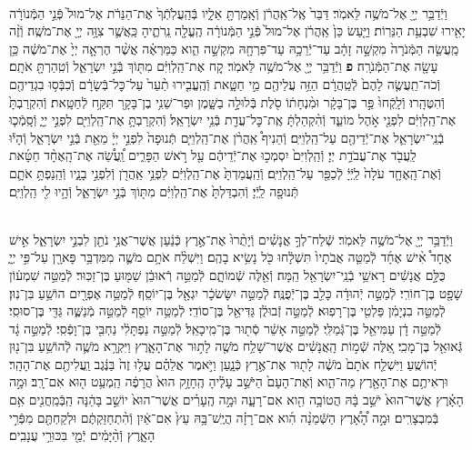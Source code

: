 \documentclass[twoside, openany, parskip=half, 11pt]{book}
\begin{document}
\begin{footnotesize}
\begin{multicols}{2}
\\
וַיְֿדַבֵּ֥ר יְיָ֖ אֶל־מֹשֶׁ֥ה לֵּאמֹֽר׃ דַּבֵּר֙ אֶֽל־אַֽהֲרֹ֔ן וְֿאָֽמַרְתָּ֖ אֵלָ֑יו בְּֿהַֽעֲלֹֽתְֿךָ֙ אֶת־הַנֵּרֹ֔ת אֶל־מוּל֙ פְּֿנֵ֣י הַמְּֿנוֹרָ֔ה יָאִ֖ירוּ שִׁבְעַ֥ת הַנֵּרֽוֹת׃ וַיַּ֤עַשׂ כֵּן֙ אַֽהֲרֹ֔ן אֶל־מוּל֙ פְּֿנֵ֣י הַמְּֿנוֹרָ֔ה הֶֽעֱלָ֖ה נֵֽרֹתֶ֑יהָ כַּֽאֲשֶׁ֛ר צִוָּ֥ה יְיָ֖ אֶת־מֹשֶֽׁה׃ וְֿזֶ֨ה מַֽעֲשֵׂ֤ה הַמְּֿנֹרָה֙ מִקְשָׁ֣ה זָהָ֔ב עַד־יְֿרֵכָ֥הּ עַד־פִּרְחָ֖הּ מִקְשָׁ֣ה הִ֑וא כַּמַּרְאֶ֗ה אֲשֶׁ֨ר הֶרְאָ֤ה יְיָ֙ אֶת־מֹשֶׁ֔ה כֵּ֥ן עָשָׂ֖ה אֶת־הַמְּֿנֹרָֽה׃ \textbf{פ}
וַיְֿדַבֵּ֥ר יְיָ֖ אֶל־מֹשֶׁ֥ה לֵּאמֹֽר׃ קַ֚ח אֶת־הַֽלְוִיִּ֔ם מִתּ֖וֹךְ בְּֿנֵ֣י יִשְׂרָאֵ֑ל וְֿטִֽהַרְתָּ֖ אֹתָֽם׃ וְֿכֹה־תַֽעֲשֶׂ֤ה לָהֶם֙ לְֿטַֽהֲרָ֔ם הַזֵּ֥ה עֲלֵיהֶ֖ם מֵ֣י חַטָּ֑את וְֿהֶֽעֱבִ֤ירוּ תַ֨עַר֙ עַל־כׇּל־בְּֿשָׂרָ֔ם וְֿכִבְּֿס֥וּ בִגְדֵיהֶ֖ם וְֿהִטֶּהָֽרוּ׃ וְֿלָֽקְֿחוּ֙ פַּ֣ר בֶּן־בָּקָ֔ר וּמִ֨נְחָת֔וֹ סֹ֖לֶת בְּֿלוּלָ֣ה בַשָּׁ֑מֶן וּפַר־שֵׁנִ֥י בֶן־בָּקָ֖ר תִּקַּ֥ח לְֿחַטָּֽאת׃ וְֿהִקְרַבְתָּ֙ אֶת־הַֽלְוִיִּ֔ם לִפְנֵ֖י אֹ֣הֶל מוֹעֵ֑ד וְֿהִ֨קְהַלְתָּ֔ אֶֽת־כׇּל־עֲדַ֖ת בְּֿנֵ֥י יִשְׂרָאֵֽל׃  וְֿהִקְרַבְתָּ֥ אֶת־הַֽלְוִיִּ֖ם לִפְנֵ֣י יְיָ֑ וְֿסָֽמְֿכ֧וּ בְֿנֵֽי־יִשְׂרָאֵ֛ל אֶת־יְֿדֵיהֶ֖ם עַל־הַֽלְוִיִּֽם׃ וְֿהֵנִיף֩ אַֽהֲרֹ֨ן אֶת־הַֽלְוִיִּ֤ם תְּֿנוּפָה֙ לִפְנֵ֣י יְיָ֔ מֵאֵ֖ת בְּֿנֵ֣י יִשְׂרָאֵ֑ל וְֿהָי֕וּ לַֽעֲבֹ֖ד אֶת־עֲבֹדַ֥ת יְיָ׃ וְֿהַֽלְוִיִּם֙ יִסְמְכ֣וּ אֶת־יְֿדֵיהֶ֔ם עַ֖ל רֹ֣אשׁ הַפָּרִ֑ים וַֽ֠עֲשֵׂ֠ה אֶת־הָֽאֶחָ֨ד חַטָּ֜את וְֿאֶת־הָֽאֶחָ֤ד עֹלָה֙ לַֽיְֿיָ֔ לְֿכַפֵּ֖ר עַל־הַֽלְוִיִּֽם׃ וְֿהַֽעֲמַדְתָּ֙ אֶת־הַֽלְוִיִּ֔ם לִפְנֵ֥י אַֽהֲרֹ֖ן וְֿלִפְנֵ֣י בָנָ֑יו וְֿהֵֽנַפְתָּ֥ אֹתָ֛ם תְּֿנוּפָ֖ה לַֽיְֿיָ׃ וְֿהִבְדַּלְתָּ֙ אֶת־הַֽלְוִיִּ֔ם מִתּ֖וֹךְ בְּֿנֵ֣י יִשְׂרָאֵ֑ל וְֿהָ֥יוּ לִ֖י הַֽלְוִיִּֽם׃

\\
וַיְֿדַבֵּ֥ר יְיָ֖ אֶל־מֹשֶׁ֥ה לֵּאמֹֽר׃ שְֿׁלַח־לְךָ֣ אֲנָשִׁ֗ים וְֿיָתֻ֨רוּ֙ אֶת־אֶ֣רֶץ כְּֿנַ֔עַן אֲשֶׁר־אֲנִ֥י נֹתֵ֖ן לִבְנֵ֣י יִשְׂרָאֵ֑ל אִ֣ישׁ אֶחָד֩ אִ֨ישׁ אֶחָ֜ד לְֿמַטֵּ֤ה אֲבֹתָיו֙ תִּשְׁלָ֔חוּ כֹּ֖ל נָשִׂ֥יא בָהֶֽם׃ וַיִּשְׁלַ֨ח אֹתָ֥ם מֹשֶׁ֛ה מִמִּדְבַּ֥ר פָּארָ֖ן עַל־פִּ֣י יְיָ֑ כֻּלָּ֣ם אֲנָשִׁ֔ים רָאשֵׁ֥י בְֿנֵֽי־יִשְׂרָאֵ֖ל הֵֽמָּה׃  וְֿאֵ֖לֶּה שְֿׁמוֹתָ֑ם לְֿמַטֵּ֣ה רְֿאוּבֵ֔ן שַׁמּ֖וּעַ בֶּן־זַכּֽוּר׃ לְֿמַטֵּ֣ה שִׁמְע֔וֹן שָׁפָ֖ט בֶּן־חוֹרִֽי׃ לְֿמַטֵּ֣ה יְֿהוּדָ֔ה כָּלֵ֖ב בֶּן־יְֿפֻנֶּֽה׃ לְֿמַטֵּ֣ה יִשָּׂשׂכָ֔ר יִגְאָ֖ל בֶּן־יוֹסֵֽף׃ לְֿמַטֵּ֥ה אֶפְרָ֖יִם הוֹשֵׁ֥עַ בִּן־נֽוּן׃ לְֿמַטֵּ֣ה בִנְיָמִ֔ן פַּלְטִ֖י בֶּן־רָפֽוּא׃ לְֿמַטֵּ֣ה זְֿבוּלֻ֔ן גַּדִּיאֵ֖ל בֶּן־סוֹדִֽי׃ לְֿמַטֵּ֥ה יוֹסֵ֖ף לְֿמַטֵּ֣ה מְֿנַשֶּׁ֑ה גַּדִּ֖י בֶּן־סוּסִֽי׃ לְֿמַטֵּ֣ה דָ֔ן עַמִּיאֵ֖ל בֶּן־גְּֿמַלִּֽי׃ לְֿמַטֵּ֣ה אָשֵׁ֔ר סְֿת֖וּר בֶּן־מִֽיכָאֵֽל׃ לְֿמַטֵּ֣ה נַפְתָּלִ֔י נַחְבִּ֖י בֶּן־וָפְֿסִֽי׃ לְֿמַטֵּ֣ה גָ֔ד גְּֿאוּאֵ֖ל בֶּן־מָכִֽי׃ אֵ֚לֶּה שְֿׁמ֣וֹת הָֽאֲנָשִׁ֔ים אֲשֶׁר־שָׁלַ֥ח מֹשֶׁ֖ה לָת֣וּר אֶת־הָאָ֑רֶץ וַיִּקְרָ֥א מֹשֶׁ֛ה לְֿהוֹשֵׁ֥עַ בִּן־נ֖וּן יְֿהוֹשֻֽׁעַ׃  וַיִּשְׁלַ֤ח אֹתָם֙ מֹשֶׁ֔ה לָת֖וּר אֶת־אֶ֣רֶץ כְּֿנָ֑עַן וַיֹּ֣אמֶר אֲלֵהֶ֗ם עֲל֥וּ זֶה֙ בַּנֶּ֔גֶב וַֽעֲלִיתֶ֖ם אֶת־הָהָֽר׃ וּרְאִיתֶ֥ם אֶת־הָאָ֖רֶץ מַה־הִ֑וא וְֿאֶת־הָעָם֙ הַיֹּשֵׁ֣ב עָלֶ֔יהָ הֶֽחָזָ֥ק הוּא֙ הֲרָפֶ֔ה הַֽמְעַ֥ט ה֖וּא אִם־רָֽב׃ וּמָ֣ה הָאָ֗רֶץ אֲשֶׁר־הוּא֙ יֹשֵׁ֣ב בָּ֔הּ הֲטוֹבָ֥ה הִ֖וא אִם־רָעָ֑ה וּמָ֣ה הֶֽעָרִ֗ים אֲשֶׁר־הוּא֙ יוֹשֵׁ֣ב בָּהֵ֔נָּה הַֽבְּֿמַֽחֲנִ֖ים אִ֥ם בְּֿמִבְצָרִֽים׃ וּמָ֣ה הָ֠אָ֠רֶץ הַשְּֿׁמֵנָ֨ה הִ֜וא אִם־רָזָ֗ה הֲיֶֽשׁ־בָּ֥הּ עֵץ֙ אִם־אַ֔יִן וְֿהִ֨תְחַזַּקְתֶּ֔ם וּלְקַחְתֶּ֖ם מִפְּֿרִ֣י הָאָ֑רֶץ וְֿהַ֨יָּמִ֔ים יְֿמֵ֖י בִּכּוּרֵ֥י עֲנָבִֽים׃


\end{multicols}
\end{footnotesize}
\end{document}
